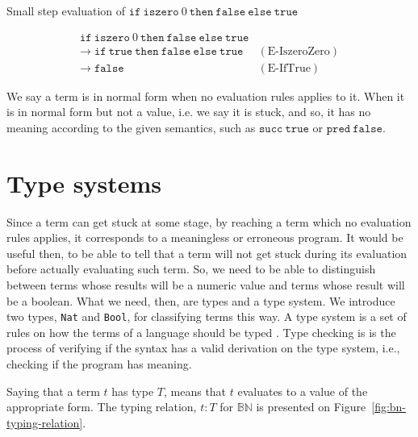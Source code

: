 \begin{example}
    \label{fig:bn-small-step-example}
    Small step evaluation of \(\texttt{if}\:\texttt{iszero}\:0\:\texttt{then}\:\texttt{false}\:\texttt{else}\:\texttt{true}\)

    \[
        \begin{array}{ll}
            \texttt{if}\:\texttt{iszero}\:0\:\texttt{then}\:\texttt{false}\:\texttt{else}\:\texttt{true} & \\
            \rightarrow\; \texttt{if}\:\texttt{true}\:\texttt{then}\:\texttt{false}\:\texttt{else}\:\texttt{true} & (\text{E-IszeroZero}) \\
            \rightarrow\; \texttt{false} & (\text{E-IfTrue})
        \end{array}
    \]
\end{example}

We say a term is in normal form when no evaluation rules applies to it.
When it is in normal form but not a value, i.e. we say it is stuck, and
so, it has no meaning according to the given semantics, such as
\(\texttt{succ}\:\texttt{true}\) or \(\texttt{pred}\:\texttt{false}\).

\section{Type systems}\label{sec:type-systems}

Since a term can get stuck at some stage, by reaching a term which no evaluation
rules applies, it corresponds to a meaningless or erroneous program. It would be
useful then, to be able to tell that a term will not get stuck during its evaluation
before actually evaluating such term. So, we need to be able to distinguish between
terms whose results will be a numeric value and terms whose result will be a boolean.
What we need, then, are types and a type system. We introduce two types, \texttt{Nat}
and \texttt{Bool}, for classifying terms this way. A type system is a set of rules on
how the terms of a language should be typed
. Type checking is is the process of verifying if the syntax has a valid derivation
on the type system, i.e., checking if the program has meaning.

Saying that a term \(t\) has type \(T\), means that \(t\) evaluates to a value
of the appropriate form. The typing relation, \(t : T\) for \(\mathbb{B}\mathbb{N}\)
is presented on Figure~\ref{fig:bn-typing-relation}.

